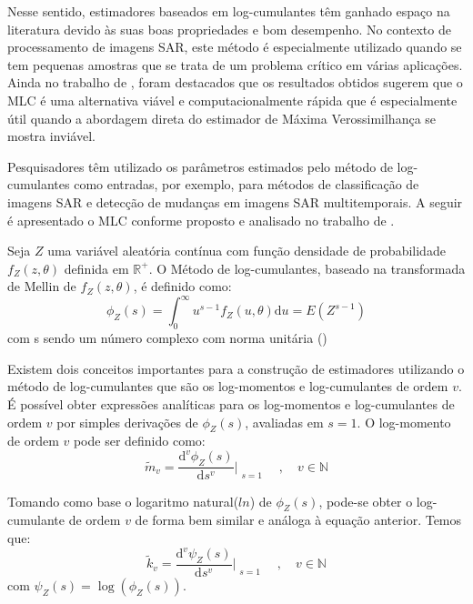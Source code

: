 \documentclass[12pt]{article}
\begin{document}
Nesse sentido, estimadores baseados em log-cumulantes têm ganhado espaço na literatura devido às suas boas propriedades e bom desempenho. No contexto de processamento de imagens SAR, este método é especialmente utilizado quando se tem pequenas amostras que se trata de um problema crítico em várias aplicações. Ainda no trabalho de \citet{krylov2013}, foram destacados que os resultados obtidos sugerem que o MLC é uma alternativa viável e computacionalmente rápida que é especialmente útil quando a abordagem direta do estimador de Máxima Verossimilhança se mostra inviável. 

Pesquisadores têm utilizado os parâmetros estimados pelo método de log-cumulantes como entradas, por exemplo, para métodos de classificação de imagens SAR e detecção de mudanças em imagens SAR multitemporais. A seguir é apresentado o MLC conforme proposto e analisado no trabalho de \citet{nicolas2002}.

Seja $Z$ uma variável aleatória contínua com função densidade de probabilidade $f_Z(z, \theta)$ definida em $\mathbb{R}^{+}$. O Método de log-cumulantes, baseado na transformada de Mellin de $f_Z(z, \theta)$, é definido como:
\begin{equation}
    \phi_{Z}(s) = \int_{0}^{\infty} u^{s-1} f_{Z}(u, \theta)\mathrm{d}u = E(Z^{s-1}) \label{eq:logcum}
\end{equation}
com s sendo um número complexo com norma unitária (\citet{nicolas2002})

Existem dois conceitos importantes para a construção de estimadores utilizando o método de log-cumulantes que são os log-momentos e log-cumulantes de ordem $v$. É possível obter expressões analíticas para os log-momentos e log-cumulantes de ordem $v$ por simples derivações de $\phi_{Z}(s)$, avaliadas em $s = 1$. O log-momento de ordem $v$ pode ser definido como:
\begin{equation}
    \tilde{m}_{v} = \frac{\mathrm{d}^{v}\phi_{Z}(s)}{\mathrm{d}s^{v}}\Bigr|_{\substack{s=1}} \quad , \quad  v \in \mathbb{N}
    \label{eq:logmomV}
\end{equation}

Tomando como base o logaritmo natural($ln$) de $\phi_{Z}(s)$, pode-se obter o log-cumulante de ordem $v$ de forma bem similar e análoga à equação anterior. Temos que:
\begin{equation}
    \tilde{k}_{v} = \frac{\mathrm{d}^{v}\psi_Z(s)}{\mathrm{d}s^{v}}\Bigr|_{\substack{s=1}} \quad , \quad  v \in \mathbb{N}
    \label{eq:logcumV}
\end{equation}
com $\psi_Z(s) = \log(\phi_{Z}(s))$.
\end{document}
